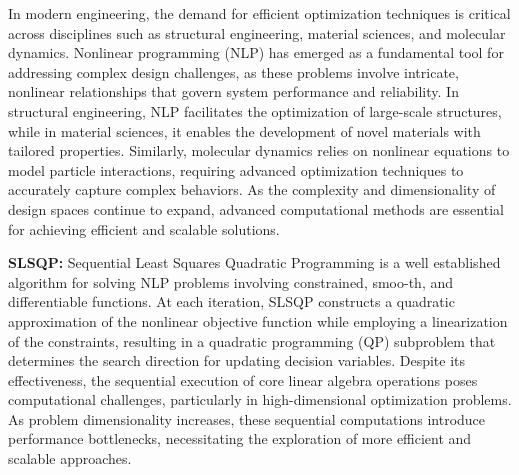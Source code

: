 In modern engineering, the demand for efficient optimization techniques is critical across disciplines such as structural engineering, material sciences, and molecular dynamics. Nonlinear programming (NLP) has emerged as a fundamental tool for addressing complex design challenges, as these problems involve intricate, nonlinear relationships that govern system performance and reliability. In structural engineering, NLP facilitates the optimization of large-scale structures, while in material sciences, it enables the development of novel materials with tailored properties. Similarly, molecular dynamics relies on nonlinear equations to model particle interactions, requiring advanced optimization techniques to accurately capture complex behaviors. As the complexity and dimensionality of design spaces continue to expand, advanced computational methods are essential for achieving efficient and scalable solutions.

\noindent
\textbf{SLSQP:} Sequential Least Squares Quadratic Programming \cite{SLSQP} is a well established algorithm for solving NLP problems involving constrained, smoo-th, and differentiable functions. At each iteration, SLSQP constructs a quadratic approximation of the nonlinear objective function while employing a linearization of the constraints, resulting in a quadratic programming (QP) subproblem that determines the search direction for updating decision variables. Despite its effectiveness, the sequential execution of core linear algebra operations poses computational challenges, particularly in high-dimensional optimization problems. As problem dimensionality increases, these sequential computations introduce performance bottlenecks, necessitating the exploration of more efficient and scalable approaches\cite{gill2015performance}.


